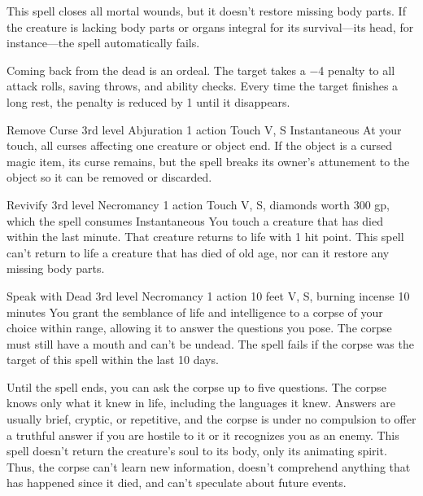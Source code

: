 \documentclass[10pt,a4paper,twoside,bg=print,twocolumn,openany,nodeprecatedcode]{dndbook}
\begin{document}
This spell closes all mortal wounds, but it doesn't restore missing body parts. If the creature is lacking body parts or organs integral for its survival—its head, for instance—the spell automatically fails.

Coming back from the dead is an ordeal. The target takes a −4 penalty to all attack rolls, saving throws, and ability checks. Every time the target finishes a long rest, the penalty is reduced by 1 until it disappears.



\DndSpellHeader%
{Remove Curse}
{3rd level Abjuration}
{1 action}
{Touch}
{V, S}
{Instantaneous}
At your touch, all curses affecting one creature or object end. If the object is a cursed magic item, its curse remains, but the spell breaks its owner's attunement to the object so it can be removed or discarded.



\DndSpellHeader%
{Revivify}
{3rd level Necromancy}
{1 action}
{Touch}
{V, S, diamonds worth 300 gp, which the spell consumes}
{Instantaneous}
You touch a creature that has died within the last minute. That creature returns to life with 1 hit point. This spell can't return to life a creature that has died of old age, nor can it restore any missing body parts.



\DndSpellHeader%
{Speak with Dead}
{3rd level Necromancy}
{1 action}
{10 feet}
{V, S, burning incense}
{10 minutes}
You grant the semblance of life and intelligence to a corpse of your choice within range, allowing it to answer the questions you pose. The corpse must still have a mouth and can't be undead. The spell fails if the corpse was the target of this spell within the last 10 days.

Until the spell ends, you can ask the corpse up to five questions. The corpse knows only what it knew in life, including the languages it knew. Answers are usually brief, cryptic, or repetitive, and the corpse is under no compulsion to offer a truthful answer if you are hostile to it or it recognizes you as an enemy. This spell doesn't return the creature's soul to its body, only its animating spirit. Thus, the corpse can't learn new information, doesn't comprehend anything that has happened since it died, and can't speculate about future events.

\end{document}
